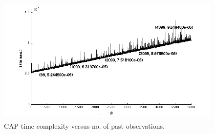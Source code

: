 \documentclass[acmtaco]{acmtrans2m}
\begin{document}
\hspace{0.3cm}
\begin{figure}
    \centering
    \includegraphics[width=1.0\linewidth,height=2.5in]{complexity_p}
    \caption{CAP time complexity versus no. of past observations.}
    \label{fig:complexityp}
\end{figure}
\end{document}
